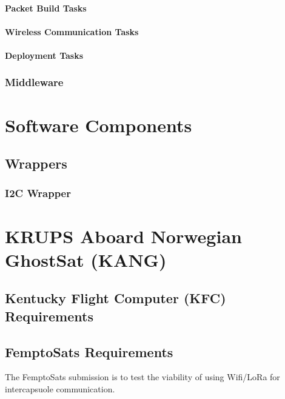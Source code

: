 \documentclass{book}
\begin{document}
\subsubsection{Packet Build Tasks}
\subsubsection{Wireless Communication Tasks}
\subsubsection{Deployment Tasks}

\subsection{Middleware}

\chapter{Software Components}

\section{Wrappers}

\subsection{I2C Wrapper}


\chapter{KRUPS Aboard Norwegian GhostSat (KANG)}
\section{Kentucky Flight Computer (KFC) Requirements}

\section{FemptoSats Requirements}
\par The FemptoSats submission is to test the viability of using Wifi/LoRa for intercapsuole communication. 
\end{document}
